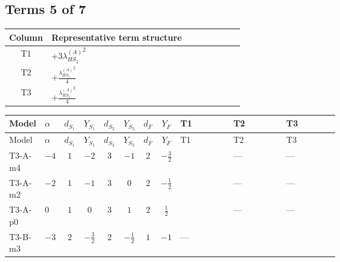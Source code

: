 \documentclass[8pt]{article}
\begin{document}
\begin{landscape}
\subsection*{Terms 5 of 7}
\begin{center}
\begin{tabular}{@{}c >{\raggedright\arraybackslash}p{0.82\linewidth}@{}}
\toprule
Column & Representative term structure \\
\midrule
T1 & \(\displaystyle +3 {\lambda_{HS_2}^{(A)}}^2\) \\
\midrule
T2 & \(\displaystyle +\frac{{\lambda_{HS_1}^{(A)}}^2}{4}\) \\
\midrule
T3 & \(\displaystyle +\frac{{\lambda_{HS_2}^{(A)}}^2}{4}\) \\
\midrule
\bottomrule
\end{tabular}
\end{center}
\smallskip
\tiny
\begin{longtable}{@{}llcccccc >{\raggedright\arraybackslash}p{0.21\linewidth} >{\raggedright\arraybackslash}p{0.21\linewidth} >{\raggedright\arraybackslash}p{0.21\linewidth}@{}}
\toprule
Model & $\alpha$ & $d_{S_1}$ & $Y_{S_1}$ & $d_{S_2}$ & $Y_{S_2}$ & $d_F$ & $Y_F$ & T1 & T2 & T3 \\
\midrule
\endfirsthead
\toprule
Model & $\alpha$ & $d_{S_1}$ & $Y_{S_1}$ & $d_{S_2}$ & $Y_{S_2}$ & $d_F$ & $Y_F$ & T1 & T2 & T3 \\
\midrule
\endhead
T3-A-m4 & $-4$ & $1$ & $-2$ & $3$ & $-1$ & $2$ & $-\frac{3}{2}$ & \scriptsize\adjustbox{max width=\linewidth}{$\begin{gathered} +3 {\lambda_{HS_2}^{(A)}}^2\end{gathered}$} & --- & --- \\
\midrule
T3-A-m2 & $-2$ & $1$ & $-1$ & $3$ & $0$ & $2$ & $-\frac{1}{2}$ & \scriptsize\adjustbox{max width=\linewidth}{$\begin{gathered} +3 {\lambda_{HS_2}^{(A)}}^2\end{gathered}$} & --- & --- \\
\midrule
T3-A-p0 & $0$ & $1$ & $0$ & $3$ & $1$ & $2$ & $\frac{1}{2}$ & \scriptsize\adjustbox{max width=\linewidth}{$\begin{gathered} +3 {\lambda_{HS_2}^{(A)}}^2\end{gathered}$} & --- & --- \\
\midrule
T3-B-m3 & $-3$ & $2$ & $-\frac{3}{2}$ & $2$ & $-\frac{1}{2}$ & $1$ & $-1$ & --- & \scriptsize\adjustbox{max width=\linewidth}{$\begin{gathered} +\frac{{\lambda_{HS_1}^{(A)}}^2}{4}\end{gathered}$} & \scriptsize\adjustbox{max width=\linewidth}{$\begin{gathered} +\frac{{\lambda_{HS_2}^{(A)}}^2}{4}\end{gathered}$} \\

\end{longtable}
\end{landscape}
\end{document}
